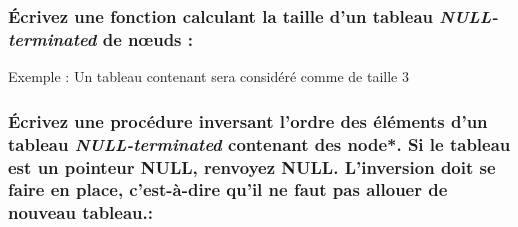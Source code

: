 \documentclass[11pt,a4paper]{article}
\begin{document}
%
%
%
%
%
%
%
%



\subsubsection{\'Ecrivez une fonction calculant la taille d'un tableau \textit{NULL-terminated} de nœuds : }

\setlength\fboxrule{0.2pt}
Exemple : Un tableau contenant  sera considéré comme de taille 3
\setlength\fboxrule{0.4pt}

%


\medskip



\bigskip

\subsubsection{\'Ecrivez une procédure inversant l'ordre des éléments d'un tableau \textit{NULL-termin\-ated} contenant des node*. Si le tableau est un pointeur NULL, renvoyez NULL. L'inversion doit se faire en place, c'est-à-dire qu'il ne faut pas allouer de nouveau tableau.: }
\end{document}
